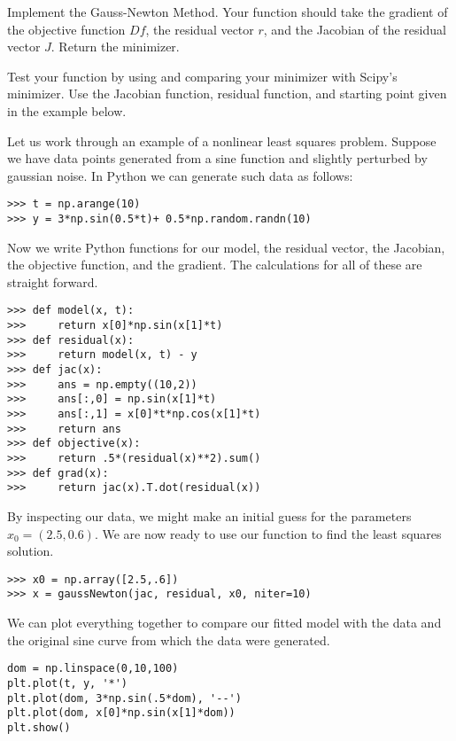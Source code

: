 \begin{problem}
Implement the Gauss-Newton Method. Your function should take
the gradient of the objective function $Df$, the residual vector $r$, and the Jacobian of the residual
vector $J$. Return the minimizer.

Test your function by using  and comparing your minimizer with Scipy's minimizer. Use the Jacobian function, residual function, and starting point given in the example below.
\end{problem}

Let us work through an example of a nonlinear least squares problem. Suppose we have data points
generated from a sine function and slightly perturbed by gaussian noise. In Python we can generate such
data as follows:
\begin{lstlisting}
>>> t = np.arange(10)
>>> y = 3*np.sin(0.5*t)+ 0.5*np.random.randn(10)
\end{lstlisting}
Now we write Python functions for our model, the residual vector, the Jacobian, the objective function,
and the gradient. The calculations for all of these are straight forward.
\begin{lstlisting}
>>> def model(x, t):
>>>     return x[0]*np.sin(x[1]*t)
>>> def residual(x):
>>>     return model(x, t) - y
>>> def jac(x):
>>>     ans = np.empty((10,2))
>>>     ans[:,0] = np.sin(x[1]*t)
>>>     ans[:,1] = x[0]*t*np.cos(x[1]*t)
>>>     return ans
>>> def objective(x):
>>>     return .5*(residual(x)**2).sum()
>>> def grad(x):
>>>     return jac(x).T.dot(residual(x))
\end{lstlisting}
By inspecting our data, we might make an initial guess for the parameters $x_0 = (2.5, 0.6)$.
We are now ready to use our  function to find the least squares solution.
\begin{lstlisting}
>>> x0 = np.array([2.5,.6])
>>> x = gaussNewton(jac, residual, x0, niter=10)
\end{lstlisting}
We can plot everything together to compare our fitted model with the data and the original sine
curve from which the data were generated.
\begin{lstlisting}
dom = np.linspace(0,10,100)
plt.plot(t, y, '*')
plt.plot(dom, 3*np.sin(.5*dom), '--')
plt.plot(dom, x[0]*np.sin(x[1]*dom))
plt.show()
\end{lstlisting}

